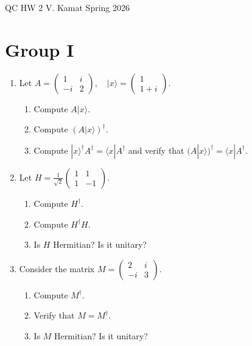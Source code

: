 \documentclass[12pt]{article}
\begin{document}
	
\centerline{QC HW 2
	\hspace{0.4 in}V. Kamat
	\hspace{0.4 in}Spring 2026}
\section*{Group I}

\begin{enumerate}

\item 
Let
$
A =
\begin{pmatrix}
1 & i \\
-i & 2
\end{pmatrix},
\quad
|x\rangle =
\begin{pmatrix}
1 \\
1+i
\end{pmatrix}.
$
\begin{enumerate}
\item Compute $A|x\rangle$.
\item Compute $(A|x\rangle)^\dagger$.
\item Compute $|x\rangle^\dagger A^\dagger=\langle x|A^\dagger$ and verify that
$
(A|x\rangle)^\dagger = \langle x| A^\dagger.
$
\end{enumerate}

\item 
Let
$
H = \frac{1}{\sqrt{2}}
\begin{pmatrix}
1 & 1 \\
1 & -1
\end{pmatrix}.
$
\begin{enumerate}
\item Compute $H^\dagger$.
\item Compute $H^\dagger H$.
\item Is $H$ Hermitian? Is it unitary?
\end{enumerate}

\item 
Consider the matrix
$
M =
\begin{pmatrix}
2 & i \\
-i & 3
\end{pmatrix}.
$
\begin{enumerate}
\item Compute $M^\dagger$.
\item Verify that $M = M^\dagger$.
\item Is $M$ Hermitian? Is it unitary?
\end{enumerate}


\end{enumerate}
\end{document}
